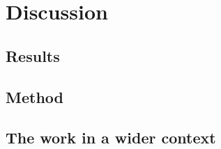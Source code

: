 
\chapter{Discussion}
\label{cha:discussion}

\lipsum[1-2]

\section{Results}
\label{sec:discussion-results}

\lipsum[1-2]

\section{Method}
\label{sec:discussion-method}

\lipsum[1-2]

\section{The work in a wider context}
\label{sec:work-wider-context}

\lipsum[1-2]


